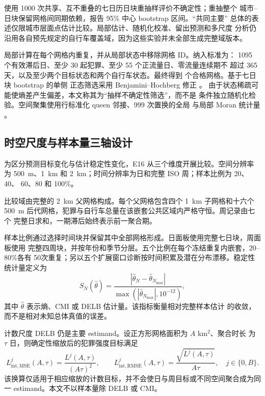 使用 1000 次共享、互不重叠的七日历日块重抽样评价不确定性；重抽整个
城市--日块保留网格间同期依赖，报告 95\% 中心 bootstrap 区间。“共同主要”
总体的表述仅限城市层面点估计比较。局部估计、随机化校准、留出预测和多尺度
分析仍沿用各自预先规定的自行车覆盖域，因为这些实验并未全部生成完整域版本。

局部计算在每个网格内重复，并从局部状态中移除网格 ID。纳入标准为：
1095 个有效滞后日、至少 30 起犯罪、至少 55 个正流量日、零流量连续期不
超过 365 天，以及至少两个目标状态和两个自行车状态。最终得到
\TotalEligibleLocalGrids{} 个合格网格。基于七日块 bootstrap 的单侧
正态筛选采用 Benjamini--Hochberg 修正 \citep{benjamini1995}。
由于状态稀疏可能使熵差产生偏差，本文称其为“抽样不确定性筛选”，而不是
条件独立随机化检验。空间聚集使用行标准化 queen 邻接、999 次置换的全局
与局部 Moran 统计量 \citep{moran1950}。

\subsection{时空尺度与样本量三轴设计}
\label{subsec:e16_scale_methods}

为区分预测目标变化与估计稳定性变化，E16 从三个维度开展比较。空间分辨率为
500~m、1~km 和 2~km；时间分辨率为日和完整 ISO 周；样本比例为 20、40、
60、80 和 100\%。

比较域由完整的 2~km 父网格构成。每个父网格包含四个 1~km 子网格和十六个
500~m 后代网格，犯罪与自行车总量在该嵌套公共区域内严格守恒。周记录由七个
完整日求和，一期滞后始终表示前一聚合期。

样本比例通过选择时间块并保留其中全部网格形成。日面板使用完整七日块，周面板使用
完整四周块，并按年份和季节分层。五个比例在每个冻结重复内嵌套，20--80\%各有
50次重复；另以五个扩展窗口诊断按时间积累及潜在分布漂移。稳定性统计量定义为
\begin{equation}
S_N(\widehat\theta)
=\frac{|\widehat\theta_N-\widehat\theta_{N_{\max}}|}
{\max(|\widehat\theta_{N_{\max}}|,10^{-12})},
\label{eq:e16_stability}
\end{equation}
其中 \(\widehat\theta\) 表示熵、CMI 或 DELB 估计量。该指标衡量相对完整样本估计
的收敛，而不是相对未知总体真值的误差。

计数尺度 DELB 仍是主要 estimand。设正方形网格面积为 \(A\) km\(^2\)、聚合时长
为 \(\tau\) 日，则确定性缩放后的犯罪强度目标满足
\begin{equation}
L_{\mathrm{int,MSE}}^{j}(A,\tau)
=\frac{L^{j}(A,\tau)}{(A\tau)^2},
\qquad
L_{\mathrm{int,RMSE}}^{j}(A,\tau)
=\frac{\sqrt{L^{j}(A,\tau)}}{A\tau},
\quad j\in\{0,B\}.
\label{eq:e16_intensity_normalization}
\end{equation}
该换算仅适用于相应缩放的计数目标，并不会使日与周目标或不同空间聚合成为同一
estimand。本文不以样本量除 DELB 或 CMI。

